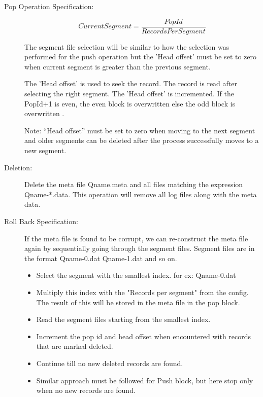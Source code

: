 \documentclass[12pt,a4paper]{article}
\begin{document}
\begin{description}
	
	\item [Pop Operation Specification:]
	
		\begin{equation}
		Current Segment =\frac{PopId}{RecordsPerSegment}
		\end{equation}
		
	The segment file selection will be similar to how the selection was performed for the push operation but the 'Head offset' must be set to zero when current segment is greater than the previous segment.
	
	The 'Head offset' is used to seek the record. The record is read after selecting the right segment. The 'Head offset' is incremented. If the PopId+1 is even, the even block is overwritten else the odd block is overwritten \citep{burnett1970study}.
	
	Note: “Head offset” must be set to zero when moving to the next segment and older segments can be deleted after the process successfully moves to a new segment.
	
	\item [Deletion:]
	Delete the meta file Qname.meta and all files matching the expression Qname-*.data. This operation will remove all log files along with the meta data.
	
	\item [Roll Back Specification:]
	
	If the meta file is found to be corrupt, we can re-construct the meta file again by sequentially going through the segment files.
	Segment files are in the format Qname-0.dat Qname-1.dat and so on.
	
	\begin{itemize}
		\item Select the segment with the smallest index. for ex: Qname-0.dat
		\item Multiply this index with the "Records per segment" from the config. The result of this will be stored in the meta file in the pop block.
		\item Read the segment files starting from the smallest index.
		\item Increment the pop id and head offset when encountered with records that are marked deleted. 
		\item Continue till no new deleted records are found.
		\item Similar approach must be followed for Push block, but here stop only when no new records are found.
	\end{itemize}
	
\end{description} 
  
\end{document}
